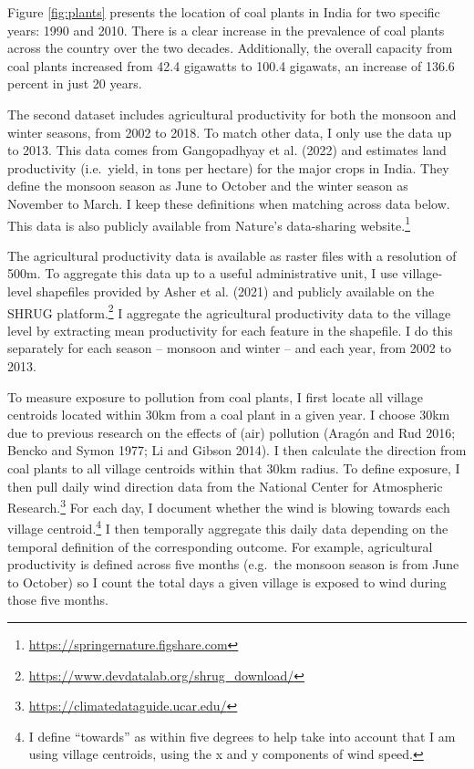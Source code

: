 \documentclass[
]{article}
\begin{document}
Figure \ref{fig:plants} presents the location of coal plants in India for two specific years: 1990 and 2010. There is a clear increase in the prevalence of coal plants across the country over the two decades. Additionally, the overall capacity from coal plants increased from 42.4 gigawatts to 100.4 gigawats, an increase of 136.6 percent in just 20 years.

The second dataset includes agricultural productivity for both the monsoon and winter seasons, from 2002 to 2018. To match other data, I only use the data up to 2013. This data comes from Gangopadhyay et al. (2022) and estimates land productivity (i.e.~yield, in tons per hectare) for the major crops in India. They define the monsoon season as June to October and the winter season as November to March. I keep these definitions when matching across data below. This data is also publicly available from Nature's data-sharing website.\footnote{\url{https://springernature.figshare.com}}

The agricultural productivity data is available as raster files with a resolution of 500m. To aggregate this data up to a useful administrative unit, I use village-level shapefiles provided by Asher et al. (2021) and publicly available on the SHRUG platform.\footnote{\url{https://www.devdatalab.org/shrug_download/}} I aggregate the agricultural productivity data to the village level by extracting mean productivity for each feature in the shapefile. I do this separately for each season -- monsoon and winter -- and each year, from 2002 to 2013.

To measure exposure to pollution from coal plants, I first locate all village centroids located within 30km from a coal plant in a given year. I choose 30km due to previous research on the effects of (air) pollution (Aragón and Rud 2016; Bencko and Symon 1977; Li and Gibson 2014). I then calculate the direction from coal plants to all village centroids within that 30km radius. To define exposure, I then pull daily wind direction data from the National Center for Atmospheric Research.\footnote{\url{https://climatedataguide.ucar.edu/}} For each day, I document whether the wind is blowing towards each village centroid.\footnote{I define ``towards'' as within five degrees to help take into account that I am using village centroids, using the x and y components of wind speed.} I then temporally aggregate this daily data depending on the temporal definition of the corresponding outcome. For example, agricultural productivity is defined across five months (e.g.~the monsoon season is from June to October) so I count the total days a given village is exposed to wind during those five months.
\end{document}
